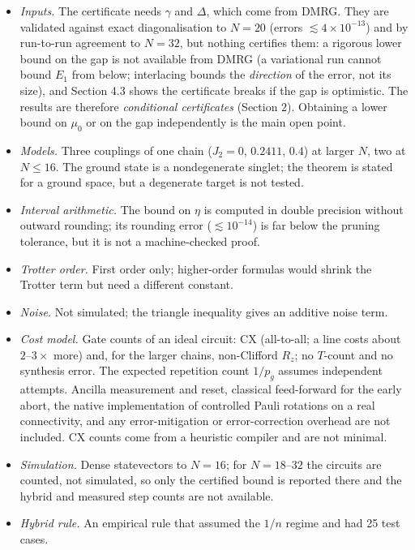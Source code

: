 \documentclass[
]{article}
\providecommand{\tightlist}{%
  \setlength{\itemsep}{0pt}\setlength{\parskip}{0pt}}
\begin{document}
\begin{itemize}
\tightlist
\item
  \emph{Inputs.} The certificate needs \(\gamma\) and \(\Delta\), which
  come from DMRG. They are validated against exact diagonalisation to
  \(N=20\) (errors \(\lesssim4\times10^{-13}\)) and by run-to-run
  agreement to \(N=32\), but nothing certifies them: a rigorous lower
  bound on the gap is not available from DMRG (a variational run cannot
  bound \(E_1\) from below; interlacing bounds the \emph{direction} of
  the error, not its size), and Section 4.3 shows the certificate breaks
  if the gap is optimistic. The results are therefore \emph{conditional
  certificates} (Section 2). Obtaining a lower bound on \(\mu_0\) or on
  the gap independently is the main open point.
\item
  \emph{Models.} Three couplings of one chain (\(J_2=0\), \(0.2411\),
  \(0.4\)) at larger \(N\), two at \(N\le16\). The ground state is a
  nondegenerate singlet; the theorem is stated for a ground space, but a
  degenerate target is not tested.
\item
  \emph{Interval arithmetic.} The bound on \(\eta\) is computed in
  double precision without outward rounding; its rounding error
  (\(\lesssim10^{-14}\)) is far below the pruning tolerance, but it is
  not a machine-checked proof.
\item
  \emph{Trotter order.} First order only; higher-order formulas would
  shrink the Trotter term but need a different constant.
\item
  \emph{Noise.} Not simulated; the triangle inequality gives an additive
  noise term.
\item
  \emph{Cost model.} Gate counts of an ideal circuit: CX (all-to-all; a
  line costs about \(2\)--\(3\times\) more) and, for the larger chains,
  non-Clifford \(R_z\); no \(T\)-count and no synthesis error. The
  expected repetition count \(1/p_g\) assumes independent attempts.
  Ancilla measurement and reset, classical feed-forward for the early
  abort, the native implementation of controlled Pauli rotations on a
  real connectivity, and any error-mitigation or error-correction
  overhead are not included. CX counts come from a heuristic compiler
  and are not minimal.
\item
  \emph{Simulation.} Dense statevectors to \(N=16\); for
  \(N=18\)--\(32\) the circuits are counted, not simulated, so only the
  certified bound is reported there and the hybrid and measured step
  counts are not available.
\item
  \emph{Hybrid rule.} An empirical rule that assumed the \(1/n\) regime
  and had 25 test cases.
\end{itemize}
\end{document}
